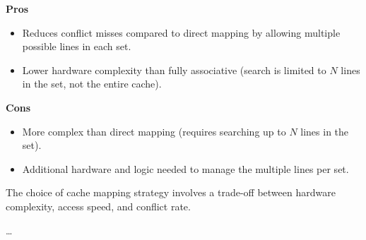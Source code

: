 \begin{minipage}[t]{0.48\textwidth}
    \textbf{Pros}
    \begin{itemize}
        \item Reduces conflict misses compared to direct mapping by allowing multiple possible lines in each set.
        \item Lower hardware complexity than fully associative (search is limited to $N$ lines in the set, not the entire cache).
    \end{itemize}
\end{minipage}\hspace{1em}
\begin{minipage}[t]{0.48\textwidth}
    \textbf{Cons}
    \begin{itemize}
        \item More complex than direct mapping (requires searching up to $N$ lines in the set).
        \item Additional hardware and logic needed to manage the multiple lines per set.
    \end{itemize}
\end{minipage}

The choice of cache mapping strategy involves a trade-off between hardware complexity, access speed, and conflict rate.

\dots


